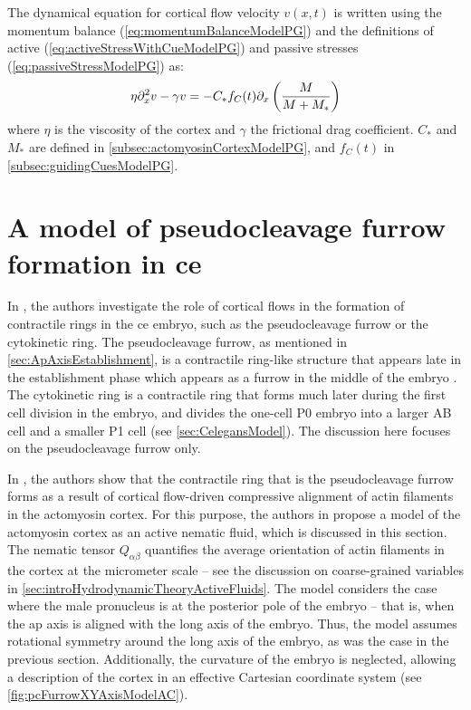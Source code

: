 The dynamical equation for cortical flow velocity $v(x,t)$ is written using the momentum balance (\autoref{eq:momentumBalanceModelPG}) and the definitions of active (\autoref{eq:activeStressWithCueModelPG}) and passive stresses (\autoref{eq:passiveStressModelPG}) as:
\begin{equation}\label{eq:velocityDynamicsModelPG}
    \eta \inlinePartial[2]{x}{v} - \gamma v = -C_*f_C(t)\inlinePartial{x}{\left(\frac{M}{M + M_*}\right)}
\end{equation}
where $\eta$ is the viscosity of the cortex and $\gamma$ the frictional drag coefficient. $C_*$ and $M_*$ are defined in \autoref{subsec:actomyosinCortexModelPG}, and $f_C(t)$ in \autoref{subsec:guidingCuesModelPG}.

\section{A model of pseudocleavage furrow formation in \acs{ce}}\label{sec:furrowFormationModelAC}
In \cite{reymann2016cortical}, the authors investigate the role of cortical flows in the formation of contractile rings in the \ac{ce} embryo, such as the pseudocleavage furrow or the cytokinetic ring. The pseudocleavage furrow, as mentioned in \autoref{sec:ApAxisEstablishment}, is a contractile ring-like structure that appears late in the establishment phase which appears as a furrow in the middle of the embryo \citep{nigon1960architecture,reymann2016cortical}. The cytokinetic ring is a contractile ring that forms much later during the first cell division in the embryo, and divides the one-cell P0 embryo into a larger AB cell and a smaller P1 cell (see \autoref{sec:CelegansModel}). The discussion here focuses on the pseudocleavage furrow only.

In \cite{reymann2016cortical}, the authors show that the contractile ring that is the pseudocleavage furrow forms as a result of cortical flow-driven compressive alignment of actin filaments in the actomyosin cortex. For this purpose, the authors in \cite{reymann2016cortical} propose a model of the actomyosin cortex as an active nematic fluid, which is discussed in this section. The nematic tensor $Q_{\alpha\beta}$ quantifies the average orientation of actin filaments in the cortex at the micrometer scale -- see the discussion on coarse-grained variables in \autoref{sec:introHydrodynamicTheoryActiveFluids}. The model considers the case where the male pronucleus is at the posterior pole of the embryo -- that is, when the \ac{ap} axis is aligned with the long axis of the embryo. Thus, the model assumes rotational symmetry around the long axis of the embryo, as was the case in the previous section. Additionally, the curvature of the embryo is neglected, allowing a description of the cortex in an effective Cartesian coordinate system (see \autoref{fig:pcFurrowXYAxisModelAC}).

